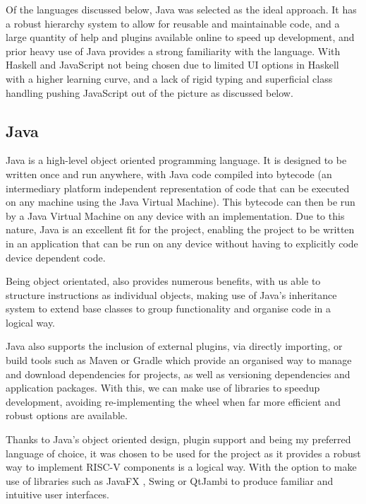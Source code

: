 Of the languages discussed below, Java was selected as the ideal approach. It has a robust hierarchy system to allow for reusable and maintainable code, and a large quantity of help and plugins available online to speed up development, and prior heavy use of Java provides a strong familiarity with the language. With Haskell and JavaScript not being chosen due to limited \ac{UI} options in Haskell with a higher learning curve, and a lack of rigid typing and superficial class handling pushing JavaScript out of the picture as discussed below.

\subsection{Java}
Java \cite{sunmicrosystems_2022_java} is a high-level object oriented programming language. It is designed to be written once and run anywhere, with Java code compiled into bytecode (an intermediary platform independent representation of code that can be executed on any machine using the Java Virtual Machine). This bytecode can then be run by a Java Virtual Machine on any device with an implementation. Due to this nature, Java is an excellent fit for the project, enabling the project to be written in an application that can be run on any device without having to explicitly code device dependent code.

Being object orientated, also provides numerous benefits, with us able to structure instructions as individual objects, making use of Java's inheritance system to extend base classes to group functionality and organise code in a logical way.

Java also supports the inclusion of external plugins, via directly importing, or build tools such as Maven \cite{porter_2022_maven} or Gradle \cite{gradleinc_2023_gradle} which provide an organised way to manage and download dependencies for projects, as well as versioning dependencies and application packages. With this, we can make use of libraries to speedup development, avoiding re-implementing the wheel when far more efficient and robust options are available.

Thanks to Java's object oriented design, plugin support and being my preferred language of choice, it was chosen to be used for the project as it provides a robust way to implement RISC-V components is a logical way. With the option to make use of libraries such as JavaFX \cite{sunmicrosystems_2022_javafx}, Swing \cite{oconner_2007_using} or QtJambi \cite{omixvisualization_2023_omixvisualizationqtjambi} to produce familiar and intuitive user interfaces.

